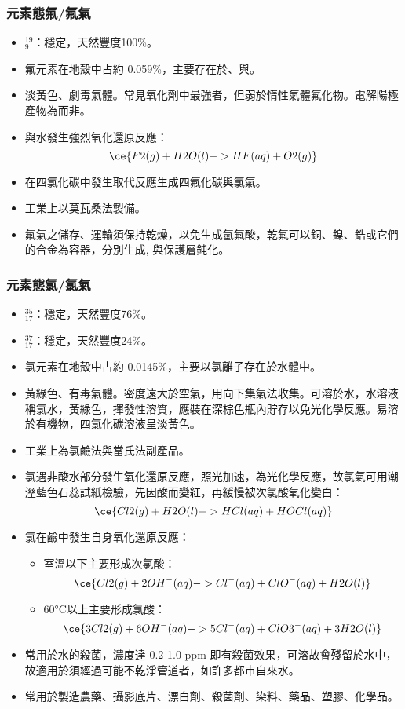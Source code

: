 \documentclass[a4paper,12pt]{report}
\begin{document}
\subsubsection{元素態氟/氟氣}
\begin{itemize}
\item $^{19}_9$\rmF：穩定，天然豐度100\%。
\item 氟元素在地殼中占約 0.059\%，主要存在於、與。
\item 淡黃色、劇毒氣體。常見氧化劑中最強者，但弱於惰性氣體氟化物。電解陽極產物為而非。
\item 與水發生強烈氧化還原反應：
\[\ce{F2(g) + H2O(l) -> HF(aq) + O2(g)}\]
\item 在四氯化碳中發生取代反應生成四氟化碳與氯氣。
\item 工業上以莫瓦桑法製備。
\item 氟氣之儲存、運輸須保持乾燥，以免生成氫氟酸，乾氟可以銅、鎳、鋯或它們的合金為容器，分別生成, 與保護層鈍化。
\end{itemize}
\subsubsection{元素態氯/氯氣}
\begin{itemize}
\item $^{35}_{17}$\rmCl：穩定，天然豐度76\%。
\item $^{37}_{17}$\rmCl：穩定，天然豐度24\%。
\item 氯元素在地殼中占約 0.0145\%，主要以氯離子存在於水體中。
\item 黃綠色、有毒氣體。密度遠大於空氣，用向下集氣法收集。可溶於水，水溶液稱氯水，黃綠色，揮發性溶質，應裝在深棕色瓶內貯存以免光化學反應。易溶於有機物，四氯化碳溶液呈淡黃色。
\item 工業上為氯鹼法與當氏法副產品。
\item 氯遇非酸水部分發生氧化還原反應，照光加速，為光化學反應，故氯氣可用潮溼藍色石蕊試紙檢驗，先因酸而變紅，再緩慢被次氯酸氧化變白：
\[\ce{Cl2(g) + H2O(l) -> HCl(aq) + HOCl(aq)}\]
\item 氯在鹼中發生自身氧化還原反應：
\begin{itemize}
\item 室溫以下主要形成次氯酸：
\[\ce{Cl2(g) + 2OH^-(aq) -> Cl^-(aq) + ClO^-(aq) + H2O(l)}\]
\item 60°C以上主要形成氯酸：
\[\ce{3Cl2(g) + 6OH^-(aq) -> 5Cl^-(aq) + ClO3^-(aq) + 3H2O(l)}\]
\end{itemize}
\item 常用於水的殺菌，濃度達 0.2-1.0 ppm 即有殺菌效果，可溶故會殘留於水中，故適用於須經過可能不乾淨管道者，如許多都市自來水。
\item 常用於製造農藥、攝影底片、漂白劑、殺菌劑、染料、藥品、塑膠、化學品。
\end{itemize}
\end{document}
